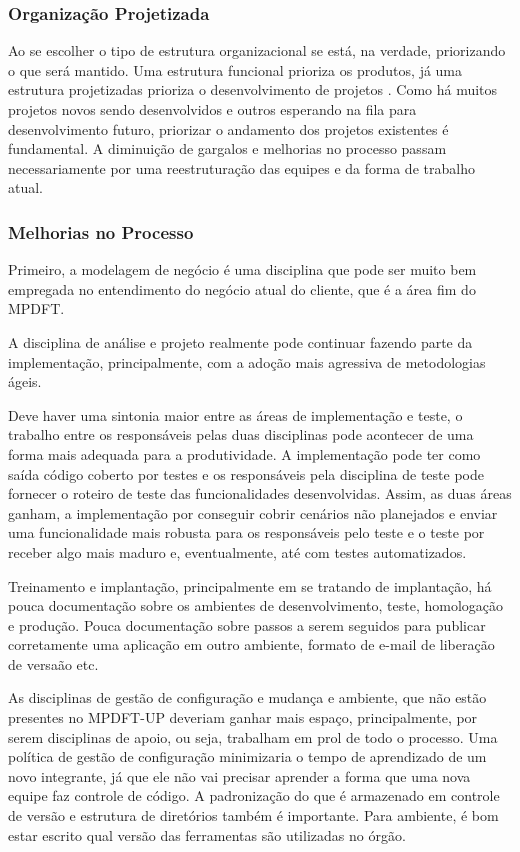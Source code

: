 \documentclass[
	article,			%
	11pt,				%
	oneside,			%
	a4paper,			%
	english,			%
	brazil,				%
	sumario=tradicional
	]{abntex2}
\begin{document}
\subsubsection{Organização Projetizada}

Ao se escolher o tipo de estrutura organizacional se está, na verdade,
priorizando o que será mantido. Uma estrutura funcional prioriza os produtos, já
uma estrutura projetizadas prioriza o desenvolvimento de projetos
\cite{larson:1999:IEEE}. Como há muitos projetos novos sendo desenvolvidos e
outros esperando na fila para desenvolvimento futuro, priorizar o andamento dos
projetos existentes é fundamental. A diminuição de gargalos e melhorias no
processo passam necessariamente por uma reestruturação das equipes e da forma de
trabalho atual.

\subsubsection{Melhorias no Processo}

Primeiro, a modelagem de negócio é uma disciplina que pode ser muito bem
empregada no entendimento do negócio atual do cliente, que é a área fim do
MPDFT.

A disciplina de análise e projeto realmente pode continuar fazendo parte da
implementação, principalmente, com a adoção mais agressiva de metodologias
ágeis.

Deve haver uma sintonia maior entre as áreas de implementação e teste, o
trabalho entre os responsáveis pelas duas disciplinas pode acontecer de uma
forma mais adequada para a produtividade. A implementação pode ter como saída
código coberto por testes e os responsáveis pela disciplina de teste pode
fornecer o roteiro de teste das funcionalidades desenvolvidas. Assim, as duas
áreas ganham, a implementação por conseguir cobrir cenários não planejados e
enviar uma funcionalidade mais robusta para os responsáveis pelo teste e o teste
por receber algo mais maduro e, eventualmente, até com testes automatizados.

Treinamento e implantação, principalmente em se tratando de implantação, há
pouca documentação sobre os ambientes de desenvolvimento, teste, homologação e
produção. Pouca documentação sobre passos a serem seguidos para publicar
corretamente uma aplicação em outro ambiente, formato de e-mail de liberação de
versaão etc.

As disciplinas de gestão de configuração e mudança e ambiente, que não estão
presentes no MPDFT-UP deveriam ganhar mais espaço, principalmente, por serem
disciplinas de apoio, ou seja, trabalham em prol de todo o processo. Uma
política de gestão de configuração minimizaria o tempo de aprendizado de um novo
integrante, já que ele não vai precisar aprender a forma que uma nova equipe faz
controle de código. A padronização do que é armazenado em controle de versão e
estrutura de diretórios também é importante. Para ambiente, é bom estar escrito
qual versão das ferramentas são utilizadas no órgão.
\end{document}
